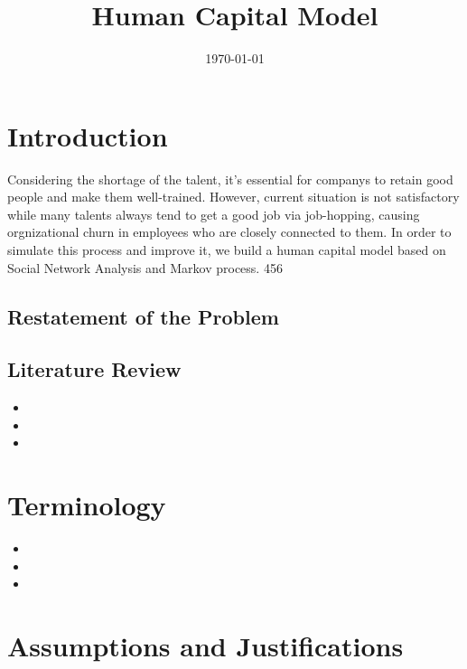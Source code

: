 \documentclass[12pt,a4paper,titlepage]{article}
\begin{document}
\title{Human Capital Model} \date{\today{}}
\maketitle

\tableofcontents

\newpage

\section{Introduction}
\label{sec:introduction}

Considering the shortage of the talent, it's essential for companys to
retain good people and make them well-trained. However, current
situation is not satisfactory while many talents always tend to get a
good job via job-hopping, causing orgnizational churn in employees who
are closely connected to them. In order to simulate this process and
improve it, we build a human capital model based on Social Network
Analysis and Markov process. 456

\subsection{Restatement of the Problem}
\label{sec:restatement-of-the-problem}

\subsection{Literature Review}
\label{sec:literature-review}

\begin{itemize}
\item
\item
\item
\end{itemize}

\section{Terminology}
\label{sec:terminology}

\begin{itemize}
\item
\item
\item
\end{itemize}

\section{Assumptions and Justifications}
\label{sec:assumptions-and-justifications}
\end{document}
